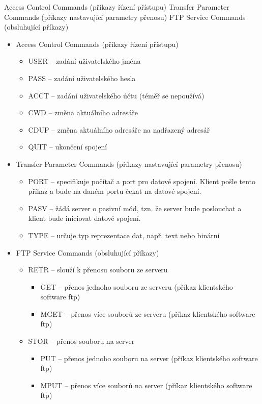 \documentclass[10pt,a4paper]{article}
\begin{document}
    Access Control Commands (příkazy řízení přístupu)
    Transfer Parameter Commands (příkazy nastavující parametry přenosu)
    FTP Service Commands (obsluhující příkazy)
\begin{itemize}
	\item Access Control Commands (příkazy řízení přístupu)
	\begin{itemize}
		\item USER – zadání uživatelského jména
		\item PASS – zadání uživatelského hesla
		\item ACCT – zadání uživatelského účtu (téměř se nepoužívá)
		\item CWD – změna aktuálního adresáře
		\item CDUP – změna aktuálního adresáře na nadřazený adresář
		\item QUIT – ukončení spojení
	\end{itemize}
	\item Transfer Parameter Commands (příkazy nastavující parametry přenosu)
	\begin{itemize}
		\item PORT – specifikuje počítač a port pro datové spojení. Klient pošle tento příkaz a bude na daném portu čekat na datové spojení.
		\item PASV – žádá server o pasivní mód, tzn. že server bude poslouchat a klient bude iniciovat datové spojení.
		\item TYPE – určuje typ reprezentace dat, např. text nebo binární
	\end{itemize}
	\item FTP Service Commands (obsluhující příkazy)
	\begin{itemize}
		\item RETR – slouží k přenosu souboru ze serveru
		\begin{itemize}
			\item GET – přenos jednoho souboru ze serveru (příkaz klientského software ftp)
			\item MGET – přenos více souborů ze serveru (příkaz klientského software ftp)
		\end{itemize}
		\item STOR – přenos souboru na server
		\begin{itemize}
			\item PUT – přenos jednoho souboru na server (příkaz klientského software ftp)
			\item MPUT – přenos více souborů na server (příkaz klientského software ftp)
		\end{itemize}

\end{itemize}
\end{itemize}
\end{document}
